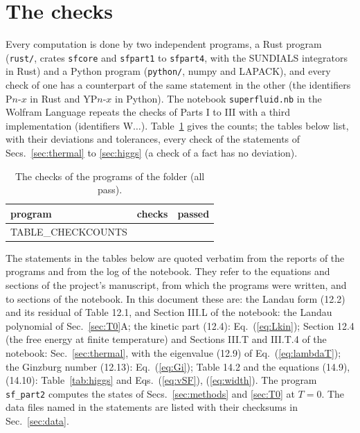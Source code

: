 \documentclass[aps,prd,onecolumn,superscriptaddress,nofootinbib,floatfix,longbibliography]{revtex4-2}
\begin{document}
\section{The checks}
\label{sec:checks}

Every computation is done by two independent programs, a Rust program (\texttt{rust/}, crates \texttt{sfcore} and
\texttt{sfpart1} to \texttt{sfpart4}, with the SUNDIALS integrators in Rust) and a Python program (\texttt{python/}, numpy and
LAPACK), and every check of one has a counterpart of the same statement in the other (the identifiers P$n$-$x$ in Rust and YP$n$-$x$
in Python). The notebook \texttt{superfluid.nb} in the Wolfram Language repeats the checks of Parts I to III with a third
implementation (identifiers W$\dots$). Table~\ref{tab:checkcounts} gives the counts; the tables below list, with their deviations and
tolerances, every check of the statements of Secs.~\ref{sec:thermal} to \ref{sec:higgs} (a check of a fact has no deviation).

\begin{table}[h]
\caption{\label{tab:checkcounts}The checks of the programs of the folder (all pass).}
\begin{ruledtabular}
\begin{tabular}{lrr}
program & checks & passed \\
\hline
{{TABLE_CHECKCOUNTS}}
\end{tabular}
\end{ruledtabular}
\end{table}

The statements in the tables below are quoted verbatim from the reports of the programs and from the log of the notebook.
They refer to the equations and sections of the project's manuscript, from which the programs were written, and to sections
of the notebook. In this document these are: the Landau form (12.2) and its residual of Table 12.1, and Section III.L of the
notebook: the Landau polynomial of Sec.~\ref{sec:T0}A; the kinetic part (12.4): Eq.~(\ref{eq:Lkin}); Section 12.4 (the free
energy at finite temperature) and Sections III.T and III.T.4 of the notebook: Sec.~\ref{sec:thermal}, with the eigenvalue
(12.9) of Eq.~(\ref{eq:lambdaT}); the Ginzburg number (12.13): Eq.~(\ref{eq:Gi}); Table 14.2 and the equations (14.9), (14.10):
Table~\ref{tab:higgs} and Eqs.~(\ref{eq:vSF}), (\ref{eq:width}). The program \texttt{sf\_part2} computes the states of
Secs.~\ref{sec:methods} and \ref{sec:T0} at $T=0$. The data files named in the statements are listed with their checksums in
Sec.~\ref{sec:data}.
\end{document}
